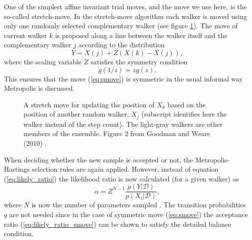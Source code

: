 \documentclass{wihuri}
\def\be{\begin{equation}}
\def\ee{\end{equation}}
\begin{document}



One of the simplest affine invariant trial moves, and the move we use here, is the so-called stretch-move. In the stretch-move algorithm each walker is moved using only one randomly selected complementary walker (see figure \ref{fig:smove}). The move of current walker $k$ is proposed along a line between the walker itself and the complementary walker $j$ according to the distribution \cite{emceehammer}
\be \label{eq:smove}
Y = X(j) + Z(X(k)-X(j)),
\ee
where the scaling variable $Z$ satisfies the symmetry condition
\be \label{eq:symmetry_condition}
g(1/z) = zg(z).
\ee
This ensures that the move (\ref{eq:smove}) is symmetric in the usual informal way Metropolis is discussed.%


\begin{figure}
\centerline{}
\caption{A stretch move for updating the position of $X_{k}$ based on the position of another random walker, $X_{j}$ (subscript identifies here the walker instead of the step count). The light-gray walkers are other members of the ensemble. Figure 2 from Goodman and Weare (2010) \cite{ensemble1}.
\label{fig:smove}}
\end{figure}


When deciding whether the new sample is accepted or not, the Metropolis-Hastings selection rules are again applied. However, instead of equation (\ref{eq:likely_ratio}) the likelihood ratio is now calculated (for a given walker) as
\be \label{eq:likely_ratio_smove} 
\alpha = Z^{N-1}\frac{p(Y|\mathcal{D})}{p(X_{t}|\mathcal{D})},
\ee
where $N$ is now the number of parameters sampled \cite{emceehammer}. The transition probabilities $q$ are not needed since in the case of symmetric move (\ref{eq:smove}) the acceptance ratio (\ref{eq:likely_ratio_smove}) can be shown to satisfy the detailed balance condition. 



\end{document}
